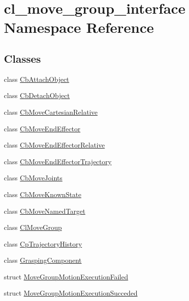 \hypertarget{namespacecl__move__group__interface}{}\section{cl\+\_\+move\+\_\+group\+\_\+interface Namespace Reference}
\label{namespacecl__move__group__interface}
\subsection*{Classes}
\begin{DoxyCompactItemize}
\item 
class \hyperlink{classcl__move__group__interface_1_1CbAttachObject}{Cb\+Attach\+Object}
\item 
class \hyperlink{classcl__move__group__interface_1_1CbDetachObject}{Cb\+Detach\+Object}
\item 
class \hyperlink{classcl__move__group__interface_1_1CbMoveCartesianRelative}{Cb\+Move\+Cartesian\+Relative}
\item 
class \hyperlink{classcl__move__group__interface_1_1CbMoveEndEffector}{Cb\+Move\+End\+Effector}
\item 
class \hyperlink{classcl__move__group__interface_1_1CbMoveEndEffectorRelative}{Cb\+Move\+End\+Effector\+Relative}
\item 
class \hyperlink{classcl__move__group__interface_1_1CbMoveEndEffectorTrajectory}{Cb\+Move\+End\+Effector\+Trajectory}
\item 
class \hyperlink{classcl__move__group__interface_1_1CbMoveJoints}{Cb\+Move\+Joints}
\item 
class \hyperlink{classcl__move__group__interface_1_1CbMoveKnownState}{Cb\+Move\+Known\+State}
\item 
class \hyperlink{classcl__move__group__interface_1_1CbMoveNamedTarget}{Cb\+Move\+Named\+Target}
\item 
class \hyperlink{classcl__move__group__interface_1_1ClMoveGroup}{Cl\+Move\+Group}
\item 
class \hyperlink{classcl__move__group__interface_1_1CpTrajectoryHistory}{Cp\+Trajectory\+History}
\item 
class \hyperlink{classcl__move__group__interface_1_1GraspingComponent}{Grasping\+Component}
\item 
struct \hyperlink{structcl__move__group__interface_1_1MoveGroupMotionExecutionFailed}{Move\+Group\+Motion\+Execution\+Failed}
\item 
struct \hyperlink{structcl__move__group__interface_1_1MoveGroupMotionExecutionSucceded}{Move\+Group\+Motion\+Execution\+Succeded}
\end{DoxyCompactItemize}
